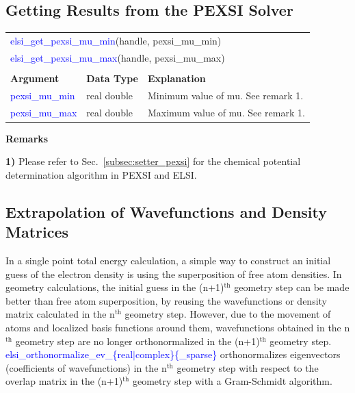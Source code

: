\documentclass{report}
\newcommand{\tcb}[1]{\textcolor{blue}{#1}}
\begin{document}
\subsection{Getting Results from the PEXSI Solver}
\label{subsec:getter_pexsi}
\begin{tabular}[]{|p{30mm}|p{45mm}|p{90mm}|}
\multicolumn{3}{l}{\tcb{elsi\_get\_pexsi\_mu\_min}(handle, pexsi\_mu\_min)}\\
\multicolumn{3}{l}{\tcb{elsi\_get\_pexsi\_mu\_max}(handle, pexsi\_mu\_max)}\\
\multicolumn{3}{l}{}\\
\hline
\multicolumn{1}{|l|}{\textbf{Argument}} & \multicolumn{1}{l|}{\textbf{Data Type}} & \multicolumn{1}{l|}{\textbf{Explanation}}\\
\hline
\tcb{pexsi\_mu\_min} & real double & Minimum value of mu. See remark 1.\\
\hline
\tcb{pexsi\_mu\_max} & real double & Maximum value of mu. See remark 1.\\
\hline
\end{tabular}

\textbf{Remarks}

\textbf{1)} Please refer to Sec.~\ref{subsec:setter_pexsi} for the chemical potential determination algorithm in PEXSI and ELSI.

\subsection{Extrapolation of Wavefunctions and Density Matrices}
\label{subsec:extrapolation}
In a single point total energy calculation, a simple way to construct an initial guess of the electron density is using the superposition of free atom densities. In geometry calculations, the initial guess in the (n+1)$^\text{th}$ geometry step can be made better than free atom superposition, by reusing the wavefunctions or density matrix calculated in the n$^\text{th}$ geometry step. However, due to the movement of atoms and localized basis functions around them, wavefunctions obtained in the n$^\text{th}$ geometry step are no longer orthonormalized in the (n+1)$^\text{th}$ geometry step. \tcb{elsi\_orthonormalize\_ev\_\{real$\vert$complex\}\{\_sparse\}} orthonormalizes eigenvectors (coefficients of wavefunctions) in the n$^\text{th}$ geometry step with respect to the overlap matrix in the (n+1)$^\text{th}$ geometry step with a Gram-Schmidt algorithm.
\end{document}

